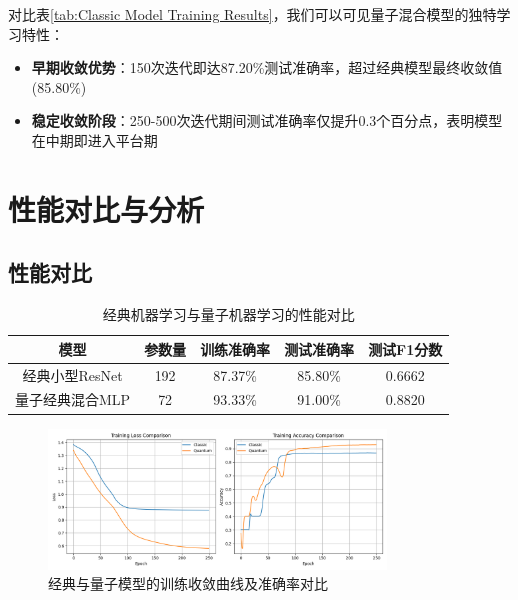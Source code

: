 \documentclass[10pt,a4paper,twoside]{article}
\numberwithin{figure}{section}%
\numberwithin{table}{section}%
\begin{document}
对比表\ref{tab:Classic Model Training Results}，我们可以可见量子混合模型的独特学习特性：

\begin{itemize}
    \item \textbf{早期收敛优势}：150次迭代即达87.20\%测试准确率，超过经典模型最终收敛值(85.80\%)
    \item \textbf{稳定收敛阶段}：250-500次迭代期间测试准确率仅提升0.3个百分点，表明模型在中期即进入平台期
\end{itemize}


\section{性能对比与分析}

\subsection{性能对比}

\begin{table}[H]
    \centering
    \caption{经典机器学习与量子机器学习的性能对比}
    \label{tab:Performance Comparison of Classical and Quantum Models}
    \begin{tabular}{ccccc}
        \toprule
        \textbf{模型} & \textbf{参数量} & \textbf{训练准确率} & \textbf{测试准确率} & \textbf{测试F1分数} \\
        \midrule
        经典小型ResNet & 192 & 87.37\% & 85.80\% & 0.6662 \\
        量子经典混合MLP & 72 & 93.33\% & 91.00\% & 0.8820 \\
        \bottomrule
    \end{tabular}
\end{table}

\begin{figure}[H]
    \centering
    \includegraphics[width=0.8\textwidth]{figures/Figure_2.png}
    \caption{经典与量子模型的训练收敛曲线及准确率对比}
    \label{fig:Comparison of Classical and Quantum Models}
\end{figure}
\end{document}
